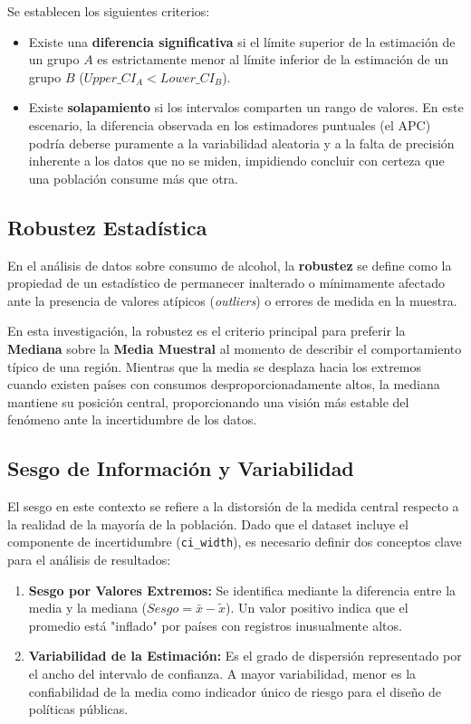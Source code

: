 \documentclass[oneside,11pt]{Latex/Classes/PhDthesisPSnPDF}
\begin{document}
Se establecen los siguientes criterios:

\begin{itemize}
    \item Existe una \textbf{diferencia significativa} si el límite superior de la estimación de un grupo $A$ es estrictamente menor al límite inferior de la estimación de un grupo $B$ ($Upper\_CI_A < Lower\_CI_B$).
    \item Existe \textbf{solapamiento} si los intervalos comparten un rango de valores. En este escenario, la diferencia observada en los estimadores puntuales (el APC) podría deberse puramente a la variabilidad aleatoria y a la falta de precisión inherente a los datos que no se miden, impidiendo concluir con certeza que una población consume más que otra.
\end{itemize}

\subsection{Robustez Estadística}

En el análisis de datos sobre consumo de alcohol, la \textbf{robustez}
se define como la propiedad de un estadístico de permanecer inalterado o
mínimamente afectado ante la presencia de valores atípicos
(\textit{outliers}) o errores de medida en la muestra.

En esta investigación, la robustez es el criterio principal para
preferir la \textbf{Mediana} sobre la \textbf{Media Muestral} al momento
de describir el comportamiento típico de una región. Mientras que la
media se desplaza hacia los extremos cuando existen países con consumos
desproporcionadamente altos, la mediana mantiene su posición central,
proporcionando una visión más estable del fenómeno ante la incertidumbre
de los datos.

\subsection{Sesgo de Información y Variabilidad}

El sesgo en este contexto se refiere a la distorsión de la medida
central respecto a la realidad de la mayoría de la población. Dado que
el dataset incluye el componente de incertidumbre (\texttt{ci\_width}),
es necesario definir dos conceptos clave para el análisis de resultados:

\begin{enumerate}
    \item \textbf{Sesgo por Valores Extremos:} Se identifica mediante la diferencia entre la media y la mediana ($Sesgo = \bar{x} - \tilde{x}$). Un valor positivo indica que el promedio está "inflado" por países con registros inusualmente altos.
    \item \textbf{Variabilidad de la Estimación:} Es el grado de dispersión representado por el ancho del intervalo de confianza. A mayor variabilidad, menor es la confiabilidad de la media como indicador único de riesgo para el diseño de políticas públicas.
\end{enumerate}
\end{document}
